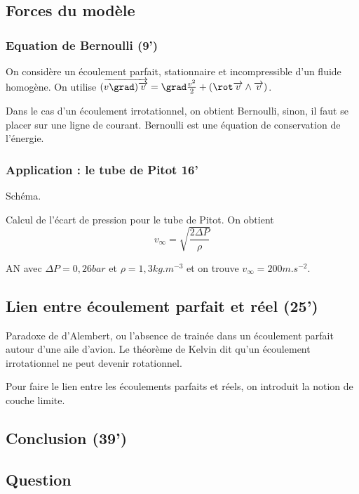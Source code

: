 \subsection{Forces du modèle}
\subsubsection{Equation de Bernoulli (9')}

On considère un écoulement parfait, stationnaire et incompressible d'un fluide homogène.
On utilise $(\overrightarrow{v\grad)\overrightarrow{v}} = \grad\frac{v^2}{2}+(\rot\overrightarrow{v}\wedge\overrightarrow{v})$.

Dans le cas d'un écoulement irrotationnel, on obtient Bernoulli, sinon, il faut se placer sur une ligne de courant.
Bernoulli est une équation de conservation de l'énergie.

\subsubsection{Application : le tube de Pitot 16'}

Schéma.

Calcul de l'écart de pression pour le tube de Pitot.
On obtient
\begin{equation}
v_\infty = \sqrt{\frac{2\Delta P}{\rho}}
\end{equation}

AN avec $\Delta P = \unit{0,26}{bar}$ et $\rho = \unit{1,3}{kg.m^{-3}}$ et on trouve $v_\infty = \unit{200}{m.s^{-2}}$.

\subsection{Lien entre écoulement parfait et réel (25')}

Paradoxe de d'Alembert, ou l'absence de trainée dans un écoulement parfait autour d'une aile d'avion.
Le théorème de Kelvin dit qu'un écoulement irrotationnel ne peut devenir rotationnel.

Pour faire le lien entre les écoulements parfaits et réels, on introduit la notion de couche limite.

\subsection{Conclusion (39')}

\subsection{Question}

